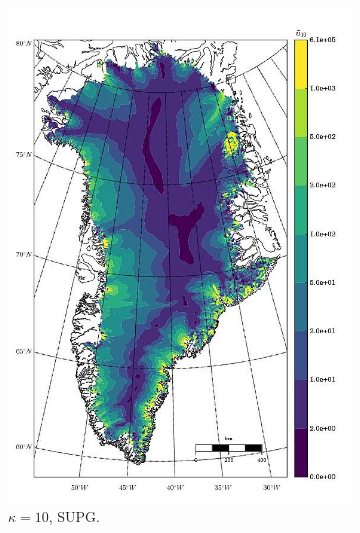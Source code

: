 \begin{figure}
\begin{subfigure}[b]{0.25\linewidth}
    \includegraphics[width=\linewidth]{images/balance_velocity/greenland/d_U_ob/Ubar_5H_kappa_10_SUPG.jpg}
  \caption{$\kappa = 10$, SUPG.}
  \label{greenland_bv_image_d_U_ob_kappa_10_SUPG}
  \end{subfigure}
  \begin{subfigure}[b]{0.25\linewidth}

\end{subfigure}
\end{figure}

